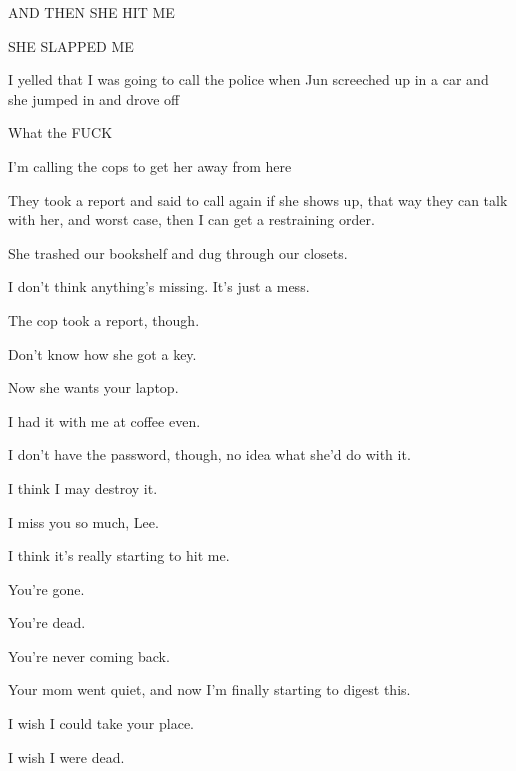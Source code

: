 { AND THEN SHE HIT ME

 SHE SLAPPED ME

 I yelled that I was going to call the police when Jun screeched up in a car and she jumped in and drove off

 What the FUCK

 I'm calling the cops to get her away from here

 They took a report and said to call again if she shows up, that way they can talk with her, and worst case, then I can get a restraining order.

 She trashed our bookshelf and dug through our closets.

 I don't think anything's missing. It's just a mess.

 The cop took a report, though.

 Don't know how she got a key.

\nopagebreak

 Now she wants your laptop.

 I had it with me at coffee even.

 I don't have the password, though, no idea what she'd do with it.

 I think I may destroy it.

\nopagebreak

 I miss you so much, Lee.

 I think it's really starting to hit me.

 You're gone.

 You're dead.

 You're never coming back.

 Your mom went quiet, and now I'm finally starting to digest this.

 I wish I could take your place.

 I wish I were dead.

}
